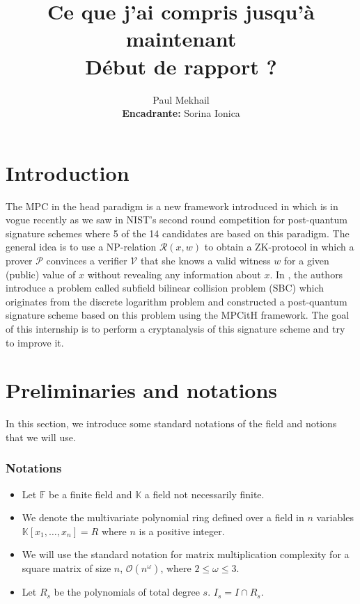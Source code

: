 \documentclass[english]{article}
\author{Paul Mekhail\\ \textbf{Encadrante:} Sorina Ionica}
\title{Ce que j'ai compris jusqu'à maintenant\\Début de rapport ?}
\begin{document}
	\maketitle
	
	\section{Introduction}
		The MPC in the head paradigm is a new framework introduced in \cite{IKOS07} which is in vogue recently as we saw in NIST's second round competition for post-quantum signature schemes where 5 of the 14 candidates are based on this paradigm.
		The general idea is to use a NP-relation $\mathcal{R}(x, w)$ to obtain a ZK-protocol in which a prover $\mathcal{P}$ convinces a verifier $\mathcal{V}$ that she knows a valid witness $w$ for a given (public) value of $x$ without revealing any information about $x$.
		In \cite{HJ23}, the authors introduce a problem called subfield bilinear collision problem (SBC) which originates from the discrete logarithm problem and constructed a post-quantum signature scheme based on this problem using the MPCitH framework.
		The goal of this internship is to perform a cryptanalysis of this signature scheme and try to improve it.
		
	\section{Preliminaries and notations}
		In this section, we introduce some standard notations of the field and notions that we will use.
		
		\subsubsection{Notations}
		
		\begin{itemize}
			\item Let $\mathbb{F}$ be a finite field and $\mathbb{K}$ a field not necessarily finite. 
			\item We denote the multivariate polynomial ring defined over a field in $n$ variables $\mathbb{K}[x_1,\dots,x_n] = R$ where $n$ is a positive integer.
			\item We will use the standard notation for matrix multiplication complexity for a square matrix of size $n$, $\mathcal{O}(n^\omega)$,
			where $2 \leq \omega \leq 3$.
			\item Let $R_{s}$ be the polynomials of total degree $s$. $I_{s} = I \cap R_{s}$.
		\end{itemize}
		
\end{document}
